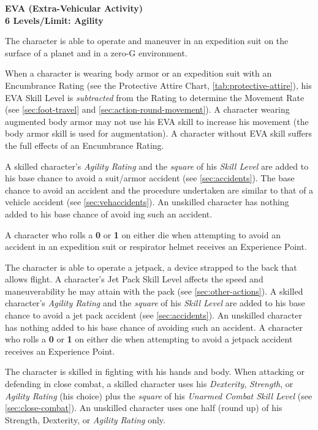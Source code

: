 \bigskip

\noindent\textbf{\sffamily\large EVA (Extra-Vehicular Activity)}\\
\textbf{6 Levels/Limit: Agility}

The character is able to operate and maneuver in an expedition suit on
the surface of a planet and in a zero-G environment.

When a character is wearing body armor or an expedition suit with an
Encumbrance Rating (see the Protective Attire Chart,
\ref{tab:protective-attire}), his EVA Skill Level is \emph{subtracted}
from the Rating to determine the Movement Rate (see
\ref{sec:foot-travel} and \ref{sec:action-round-movement}).  A
character wearing augmented body armor may not use his EVA skill to
increase his movement (the body armor skill is used for augmentation).
A character without EVA skill suffers the full effects of an
Encumbrance Rating.

A skilled character's \emph{Agility Rating} and the \emph{square} of
his \emph{Skill Level} are added to his base chance to avoid a
suit/armor accident (see \ref{sec:accidents}).  The base chance to
avoid an accident and the procedure undertaken are similar to that of
a vehicle accident (see \ref{sec:vehaccidents}).  An unskilled
character has nothing added to his base chance of avoid ing such an
accident.

A character who rolls a \textbf{0} or \textbf{1} on either die when
attempting to avoid an accident in an expedition suit or respirator
helmet receives an Experience Point.

\label{sec:skill-jet-pack}

The character is able to operate a jetpack, a device strapped to the
back that allows flight.  A character's Jet Pack Skill Level affects
the speed and maneuverability he may attain with the pack (see
\ref{sec:other-actions}).  A skilled character's \emph{Agility Rating} and the
\emph{square} of his \emph{Skill Level} are added to his base chance
to avoid a jet pack accident (see \ref{sec:accidents}).  An unskilled
character has nothing added to his base chance of avoiding such an
accident.  A character who rolls a \textbf{0} or \textbf{1} on either
die when attempting to avoid a jetpack accident receives an Experience
Point.

\label{sec:skill-unarmed-combat}

The character is skilled in fighting with his hands and body.  When
attacking or defending in close combat, a skilled character uses his
\emph{Dexterity}, \emph{Strength}, or \emph{Agility Rating} (his
choice) plus the \emph{square} of his \emph{Unarmed Combat Skill
  Level} (see \ref{sec:close-combat}).  An unskilled character uses one
half (round up) of his Strength, Dexterity, or \emph{Agility Rating}
only.

